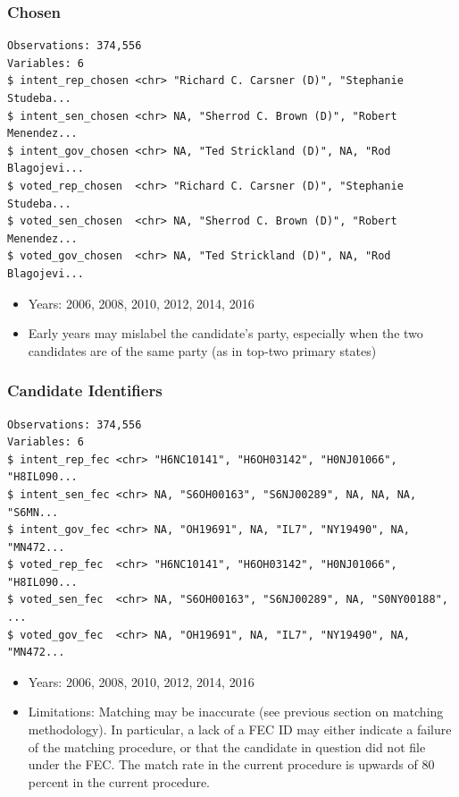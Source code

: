 \documentclass[10pt,article,oneside]{memoir}
\theoremstyle{definition}
\begin{document}
\subsubsection{Chosen}\label{chosen}

\begin{verbatim}
Observations: 374,556
Variables: 6
$ intent_rep_chosen <chr> "Richard C. Carsner (D)", "Stephanie Studeba...
$ intent_sen_chosen <chr> NA, "Sherrod C. Brown (D)", "Robert Menendez...
$ intent_gov_chosen <chr> NA, "Ted Strickland (D)", NA, "Rod Blagojevi...
$ voted_rep_chosen  <chr> "Richard C. Carsner (D)", "Stephanie Studeba...
$ voted_sen_chosen  <chr> NA, "Sherrod C. Brown (D)", "Robert Menendez...
$ voted_gov_chosen  <chr> NA, "Ted Strickland (D)", NA, "Rod Blagojevi...
\end{verbatim}

\begin{itemize}
\tightlist
\item
  Years: 2006, 2008, 2010, 2012, 2014, 2016
\item
  Early years may mislabel the candidate's party, especially when the
  two candidates are of the same party (as in top-two primary states)
\end{itemize}

\subsubsection{Candidate Identifiers}\label{candidate-identifiers}

\begin{verbatim}
Observations: 374,556
Variables: 6
$ intent_rep_fec <chr> "H6NC10141", "H6OH03142", "H0NJ01066", "H8IL090...
$ intent_sen_fec <chr> NA, "S6OH00163", "S6NJ00289", NA, NA, NA, "S6MN...
$ intent_gov_fec <chr> NA, "OH19691", NA, "IL7", "NY19490", NA, "MN472...
$ voted_rep_fec  <chr> "H6NC10141", "H6OH03142", "H0NJ01066", "H8IL090...
$ voted_sen_fec  <chr> NA, "S6OH00163", "S6NJ00289", NA, "S0NY00188", ...
$ voted_gov_fec  <chr> NA, "OH19691", NA, "IL7", "NY19490", NA, "MN472...
\end{verbatim}

\begin{itemize}
\tightlist
\item
  Years: 2006, 2008, 2010, 2012, 2014, 2016
\item
  Limitations: Matching may be inaccurate (see previous section on
  matching methodology). In particular, a lack of a FEC ID may either
  indicate a failure of the matching procedure, or that the candidate in
  question did not file under the FEC. The match rate in the current
  procedure is upwards of 80 percent in the current procedure.
\end{itemize}
\end{document}
